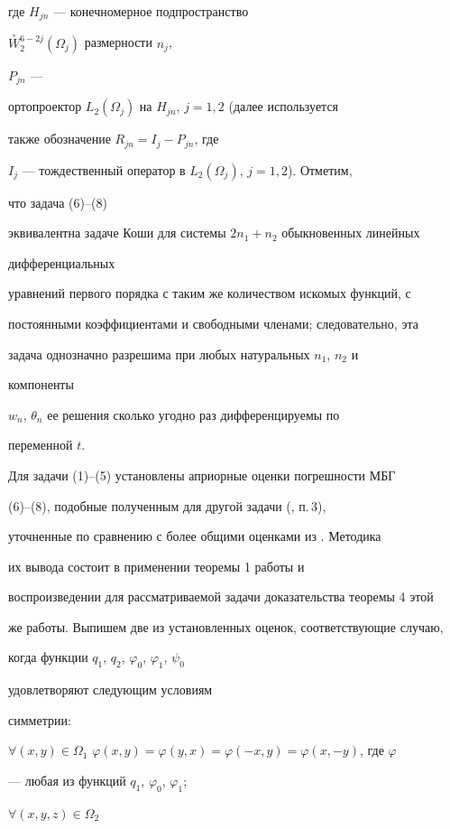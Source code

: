 где $H_{jn}$ --- конечномерное подпространство


$\overset{\circ}{W}{}^{6-2j}_2(\Omega_j)$ размерности $n_j$,


$P_{jn}$ ---


ортопроектор $L_2(\Omega_j)$ на $H_{jn}$, $j=1,2$ (далее используется


также обозначение $R_{jn}=I_j-P_{jn}$, где


$I_j$ --- тождественный оператор в $L_2(\Omega_j)$, $j=1,2$). Отметим,


что задача (6)--(8)


эквивалентна задаче Коши для системы $2n_1+n_2$ обыкновенных линейных


дифференциальных


уравнений первого порядка с таким же количеством искомых функций, с


постоянными коэффициентами и свободными членами; следовательно, эта


задача однозначно разрешима при любых натуральных $n_1$, $n_2$ и


компоненты


$w_n$, $\theta_n$ ее решения сколько угодно раз дифференцируемы по


переменной $t$.





Для задачи (1)--(5) установлены априорные оценки погрешности МБГ


(6)--(8), подобные полученным для другой задачи (\cite{Z3}, п.\,3),


уточненные по сравнению с более общими оценками из \cite{Z4}. Методика


их вывода состоит в применении теоремы 1 работы \cite{Z3} и


воспроизведении для рассматриваемой задачи доказательства теоремы 4 этой


же работы. Выпишем две из установленных оценок, соответствующие случаю,


когда функции $q_1$, $q_2$, $\varphi_0$, $\varphi_1$, $\psi_0$


удовлетворяют следующим условиям


симметрии:


$\forall(x,y)\in\Omega_1$\; $\varphi(x,y)=\varphi(y,x)=


\varphi(-x,y)=\varphi(x,-y)$, где $\varphi$


--- любая из функций $q_1$, $\varphi_0$, $\varphi_1$;


$\forall(x,y,z)\in\Omega_2$\;


